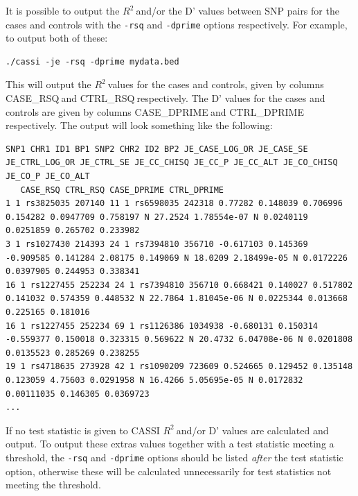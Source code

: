 \documentclass[a4paper,12pt]{article}
\newcommand{\code}[1]{{\footnotesize{{\tt #1}}}}
\begin{document}
It is possible to output the $R^2\ $and/or the D' values between SNP pairs for the cases and controls with the \code{-rsq} and \code{-dprime} options respectively. For example, to output both of these: 
\vspace{0.35cm} \begin{lstlisting}
./cassi -je -rsq -dprime mydata.bed

\end{lstlisting} \vspace{0.35cm}
This will output the $R^2\ $values for the cases and controls, given by columns CASE\_RSQ$\:$and CTRL\_RSQ$\:$respectively. The D' values for the cases and controls are given by columns CASE\_DPRIME$\:$and CTRL\_DPRIME$\:$respectively. The output will look something like the following: 
\vspace{0.35cm} \begin{lstlisting}
SNP1 CHR1 ID1 BP1 SNP2 CHR2 ID2 BP2 JE_CASE_LOG_OR JE_CASE_SE JE_CTRL_LOG_OR JE_CTRL_SE JE_CC_CHISQ JE_CC_P JE_CC_ALT JE_CO_CHISQ JE_CO_P JE_CO_ALT 
   CASE_RSQ CTRL_RSQ CASE_DPRIME CTRL_DPRIME
1 1 rs3825035 207140 11 1 rs6598035 242318 0.77282 0.148039 0.706996 0.154282 0.0947709 0.758197 N 27.2524 1.78554e-07 N 0.0240119 0.0251859 0.265702 0.233982
3 1 rs1027430 214393 24 1 rs7394810 356710 -0.617103 0.145369 -0.909585 0.141284 2.08175 0.149069 N 18.0209 2.18499e-05 N 0.0172226 0.0397905 0.244953 0.338341
16 1 rs1227455 252234 24 1 rs7394810 356710 0.668421 0.140027 0.517802 0.141032 0.574359 0.448532 N 22.7864 1.81045e-06 N 0.0225344 0.013668 0.225165 0.181016
16 1 rs1227455 252234 69 1 rs1126386 1034938 -0.680131 0.150314 -0.559377 0.150018 0.323315 0.569622 N 20.4732 6.04708e-06 N 0.0201808 0.0135523 0.285269 0.238255
19 1 rs4718635 273928 42 1 rs1090209 723609 0.524665 0.129452 0.135148 0.123059 4.75603 0.0291958 N 16.4266 5.05695e-05 N 0.0172832 0.00111035 0.146305 0.0369723
...

\end{lstlisting} \vspace{0.35cm}
If no test statistic is given to CASSI $R^2\ $and/or D' values are calculated and output. To output these extras values together with a test statistic meeting a threshold, the \code{-rsq} and \code{-dprime} options should be listed {\it after} the test statistic option, otherwise these will be calculated unnecessarily for test statistics not meeting the threshold. 



\end{document}
